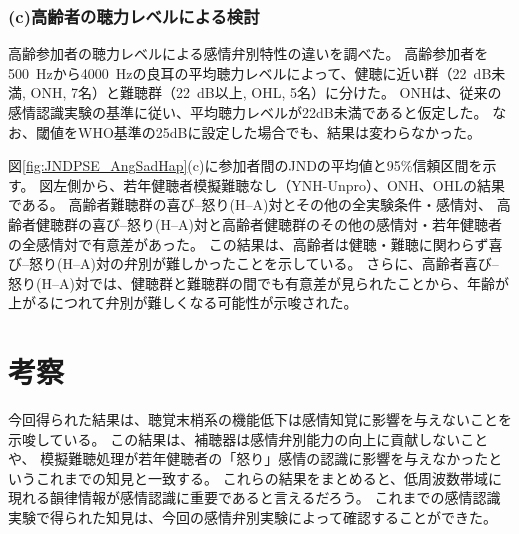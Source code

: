 \subsubsection{(c)高齢者の聴力レベルによる検討}
高齢参加者の聴力レベルによる感情弁別特性の違いを調べた。
高齢参加者を500~Hzから4000~Hzの良耳の平均聴力レベルによって、健聴に近い群（22~dB未満, ONH, 7名）と難聴群（22~dB以上, OHL, 5名）に分けた。
ONHは、従来の感情認識実験\cite{christensen2019effects}の基準に従い、平均聴力レベルが22dB未満であると仮定した。
なお、閾値をWHO基準の25dBに設定した場合でも、結果は変わらなかった。

図\ref{fig:JNDPSE_AngSadHap}(c)に参加者間のJNDの平均値と95\%信頼区間を示す。
図左側から、若年健聴者模擬難聴なし（YNH-Unpro）、ONH、OHLの結果である。
高齢者難聴群の喜び--怒り(H--A)対とその他の全実験条件・感情対、
高齢者健聴群の喜び--怒り(H--A)対と高齢者健聴群のその他の感情対・若年健聴者の全感情対で有意差があった。
この結果は、高齢者は健聴・難聴に関わらず喜び--怒り(H--A)対の弁別が難しかったことを示している。
さらに、高齢者喜び--怒り(H--A)対では、健聴群と難聴群の間でも有意差が見られたことから、年齢が上がるにつれて弁別が難しくなる可能性が示唆された。







\section{考察}
今回得られた結果は、聴覚末梢系の機能低下は感情知覚に影響を与えないことを示唆している。
この結果は、補聴器は感情弁別能力の向上に貢献しないこと\cite{goy2018hearing} や、
模擬難聴処理が若年健聴者の「怒り」感情の認識に影響を与えなかった\cite{morgan2022perceived}というこれまでの知見と一致する。
これらの結果をまとめると、低周波数帯域に現れる韻律情報が感情認識に重要であると言えるだろう\cite{orbelo2005impaired,ben2019age}。
これまでの感情認識実験で得られた知見は、今回の感情弁別実験によって確認することができた。

